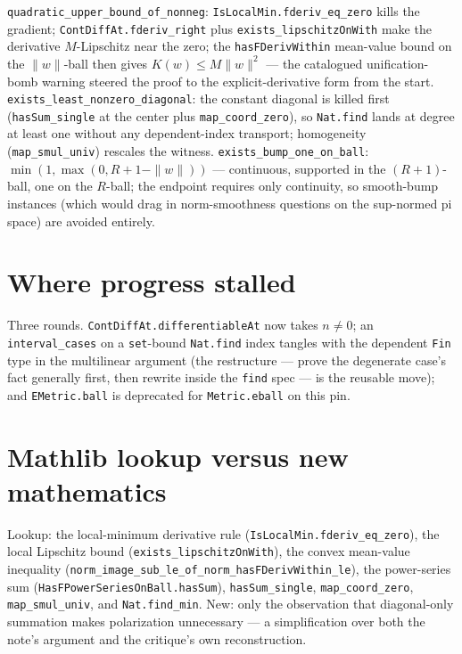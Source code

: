 \documentclass[11pt]{article}
\newcommand{\code}[1]{\texttt{#1}}
\begin{document}
\begin{sloppypar}
\code{quadratic\_upper\_bound\_of\_nonneg}:
\code{IsLocalMin.fderiv\_eq\_zero} kills the gradient;
\code{ContDiffAt.fderiv\_right} plus
\code{exists\_lipschitzOnWith} make the derivative $M$-Lipschitz
near the zero; the \code{hasFDerivWithin} mean-value bound on the
$\|w\|$-ball then gives $K(w) \le M\|w\|^2$ --- the catalogued
unification-bomb warning steered the proof to the
explicit-derivative form from the start.
\code{exists\_least\_nonzero\_diagonal}: the constant diagonal is
killed first (\code{hasSum\_single} at the center plus
\code{map\_coord\_zero}), so \code{Nat.find} lands at degree at
least one without any dependent-index transport; homogeneity
(\code{map\_smul\_univ}) rescales the witness.
\code{exists\_bump\_one\_on\_ball}: $\min(1, \max(0, R+1-\|w\|))$ ---
continuous, supported in the $(R{+}1)$-ball, one on the $R$-ball;
the endpoint requires only continuity, so smooth-bump instances
(which would drag in norm-smoothness questions on the sup-normed
pi space) are avoided entirely.
\end{sloppypar}

\section{Where progress stalled}

\begin{sloppypar}
Three rounds. \code{ContDiffAt.differentiableAt} now takes
$n \ne 0$; an \code{interval\_cases} on a \code{set}-bound
\code{Nat.find} index tangles with the dependent \code{Fin} type in
the multilinear argument (the restructure --- prove the degenerate
case's fact generally first, then rewrite inside the \code{find}
spec --- is the reusable move); and \code{EMetric.ball} is deprecated
for \code{Metric.eball} on this pin.
\end{sloppypar}

\section{Mathlib lookup versus new mathematics}

\begin{sloppypar}
Lookup: the local-minimum derivative rule
(\code{IsLocalMin.fderiv\_eq\_zero}), the local Lipschitz bound
(\code{exists\_lipschitzOnWith}), the convex mean-value inequality
(\code{norm\_image\_sub\_le\_of\_norm\_hasFDerivWithin\_le}), the
power-series sum (\code{HasFPowerSeriesOnBall.hasSum}),
\code{hasSum\_single}, \code{map\_coord\_zero},
\code{map\_smul\_univ}, and \code{Nat.find\_min}. New: only the
observation that diagonal-only summation makes polarization
unnecessary --- a simplification over both the note's argument and
the critique's own reconstruction.
\end{sloppypar}
\end{document}
